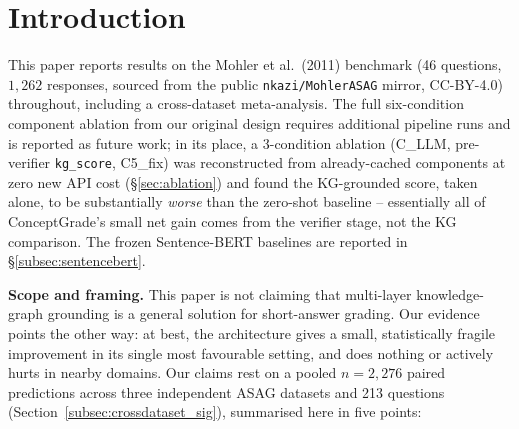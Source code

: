 \documentclass[conference]{IEEEtran}
\begin{document}
\section{Introduction}
\label{sec:intro}

This paper reports results on the Mohler et al.\ (2011) benchmark
(46 questions, $1{,}262$ responses, sourced from the public
\texttt{nkazi/MohlerASAG} mirror, CC-BY-4.0) throughout, including a
cross-dataset meta-analysis. The full six-condition component ablation
from our original design requires additional pipeline runs and is
reported as future work; in its place, a 3-condition ablation
(C\_LLM, pre-verifier \texttt{kg\_score}, C5\_fix) was reconstructed
from already-cached components at zero new API cost
(\S\ref{sec:ablation}) and found the KG-grounded score, taken alone,
to be substantially \emph{worse} than the zero-shot baseline --
essentially all of ConceptGrade's small net gain comes from the
verifier stage, not the KG comparison. The frozen Sentence-BERT
baselines are reported in \S\ref{subsec:sentencebert}.

\textbf{Scope and framing.} This paper is not claiming that multi-layer
knowledge-graph grounding is a general solution for short-answer
grading. Our evidence points the other way: at best, the architecture
gives a small, statistically fragile improvement in its single most
favourable setting, and does nothing or actively hurts in nearby
domains. Our claims rest on a pooled $n = 2{,}276$ paired predictions
across three independent ASAG datasets and 213 questions
(Section~\ref{subsec:crossdataset_sig}), summarised here in five points:
\end{document}

